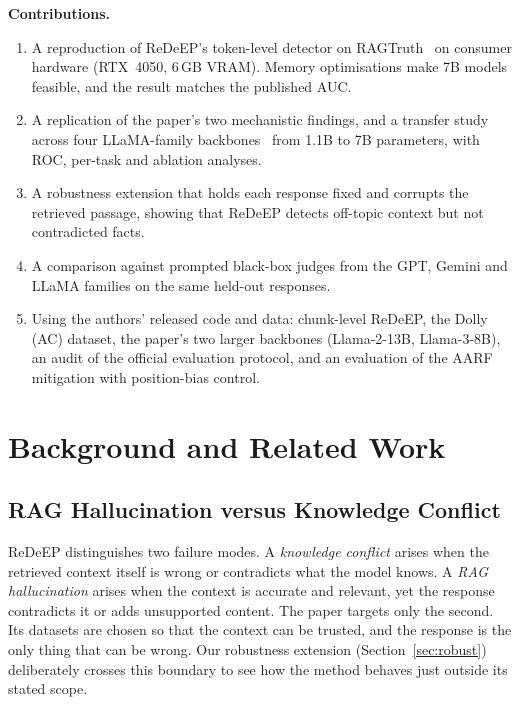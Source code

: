 \documentclass[conference]{IEEEtran}
\begin{document}
\textbf{Contributions.}
\begin{enumerate}
\item A reproduction of ReDeEP's token-level detector on RAGTruth~\cite{niu2024ragtruth} on consumer hardware (RTX~4050, 6\,GB VRAM). Memory optimisations make 7B models feasible, and the result matches the published AUC.
\item A replication of the paper's two mechanistic findings, and a transfer study across four LLaMA-family backbones~\cite{touvron2023llama2} from 1.1B to 7B parameters, with ROC, per-task and ablation analyses.
\item A robustness extension that holds each response fixed and corrupts the retrieved passage, showing that ReDeEP detects off-topic context but not contradicted facts.
\item A comparison against prompted black-box judges from the GPT, Gemini and LLaMA families on the same held-out responses.
\item Using the authors' released code and data: chunk-level ReDeEP, the Dolly (AC) dataset, the paper's two larger backbones (Llama-2-13B, Llama-3-8B), an audit of the official evaluation protocol, and an evaluation of the AARF mitigation with position-bias control.
\end{enumerate}

\section{Background and Related Work}
\subsection{RAG Hallucination versus Knowledge Conflict}
ReDeEP distinguishes two failure modes. A \emph{knowledge conflict} arises when the retrieved context itself is wrong or contradicts what the model knows. A \emph{RAG hallucination} arises when the context is accurate and relevant, yet the response contradicts it or adds unsupported content. The paper targets only the second. Its datasets are chosen so that the context can be trusted, and the response is the only thing that can be wrong. Our robustness extension (Section~\ref{sec:robust}) deliberately crosses this boundary to see how the method behaves just outside its stated scope.
\end{document}
